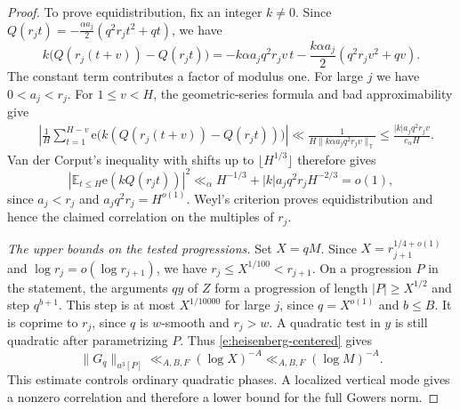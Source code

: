 \documentclass[12pt]{amsart}
\newcommand{\1}{\mathbf 1}
\newcommand{\e}{\mathrm e}
\theoremstyle{definition}
\begin{document}
\begin{proof}
To prove equidistribution, fix an integer \(k\ne0\). Since
\(Q(r_jt)=-\frac{\alpha a_j}{2}(q^2r_jt^2+qt)\), we have
\[
 k\bigl(Q(r_j(t+v))-Q(r_jt)\bigr)
 =-k\alpha a_jq^2r_jv\,t
  -\frac{k\alpha a_j}{2}(q^2r_jv^2+qv).
\]
The constant term contributes a factor of modulus one. For large \(j\) we have \(0<a_j<r_j\). For
\(1\leq v<H\), the geometric-series formula and bad approximability
give
\[
\begin{aligned}
 &\left|\frac1H\sum_{t=1}^{H-v}
    \e\bigl(k(Q(r_j(t+v))-Q(r_jt))\bigr)\right|\ll
 \frac{1}{H\|k\alpha a_jq^2r_jv\|_{\mathbb T}}
 \leq \frac{|k|a_jq^2r_jv}{c_\alpha H}.
\end{aligned}
\]
Van der Corput's inequality with shifts up to
\(\lfloor H^{1/3}\rfloor\) therefore gives
\[
 \left|\mathbb E_{t\leq H}\e(kQ(r_jt))\right|^2
 \ll_\alpha H^{-1/3}+|k|a_jq^2r_jH^{-2/3}=o(1),
\]
since \(a_j<r_j\) and \(a_jq^2r_j=H^{o(1)}\).
Weyl's criterion proves equidistribution and hence the claimed
correlation on the multiples of \(r_j\).



\medskip
\noindent\emph{The upper bounds on the tested progressions.}
Set \(X=qM\). Since \(X=r_{j+1}^{1/4+o(1)}\) and
\(\log r_j=o(\log r_{j+1})\), we have
\(r_j\leq X^{1/100}<r_{j+1}\). On a progression \(P\) in the
statement, the arguments \(qy\) of \(Z\) form a progression
of length \(|P|\geq X^{1/2}\) and step \(q^{b+1}\).
This step is at most \(X^{1/10000}\) for large \(j\), since
\(q=X^{o(1)}\) and \(b\leq B\). It is coprime to \(r_j\),
since \(q\) is \(w\)-smooth and \(r_j>w\). A quadratic test
in \(y\) is still quadratic after parametrizing \(P\).
Thus \eqref{e:heisenberg-centered} gives
\[
 \|G_q\|_{u^3[P]}\ll_{A,B,F}(\log X)^{-A}
 \ll_{A,B,F}(\log M)^{-A}.
\]
This estimate controls ordinary quadratic phases.
A localized vertical mode gives a nonzero correlation and
therefore a lower bound for the full Gowers norm.

\medskip


\end{proof}
\end{document}
